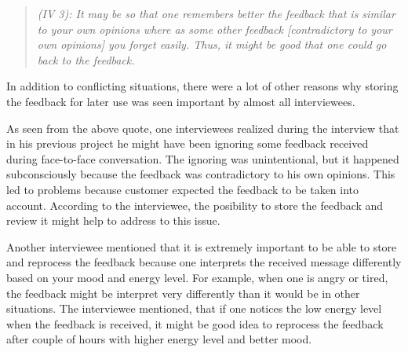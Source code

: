 \documentclass[english,12pt,a4paper,pdftex]{article}
\newcommand{\q}[2]{
\begin{quote}
\emph{(IV #1): #2}
\end{quote}}
\begin{document}
\q{3}{It may be so that one remembers better the feedback that is similar to your own opinions where as some other feedback [contradictory to your own opinions] you forget easily. Thus, it might be good that one could go back to the feedback.}

In addition to conflicting situations, there were a lot of other reasons why storing the feedback for later use was seen important by almost all interviewees.

As seen from the above quote, one interviewees realized during the interview that in his previous project he might have been ignoring some feedback received during face-to-face conversation. The ignoring was unintentional, but it happened subconsciously because the feedback was contradictory to his own opinions. This led to problems because customer expected the feedback to be taken into account. According to the interviewee, the posibility to store the feedback and review it might help to address to this issue.

Another interviewee mentioned that it is extremely important to be able to store and reprocess the feedback because one interprets the received message differently based on your mood and energy level. For example, when one is angry or tired, the feedback might be interpret very differently than it would be in other situations. The interviewee mentioned, that if one notices the low energy level when the feedback is received, it might be good idea to reprocess the feedback after couple of hours with higher energy level and better mood.

\end{document}
